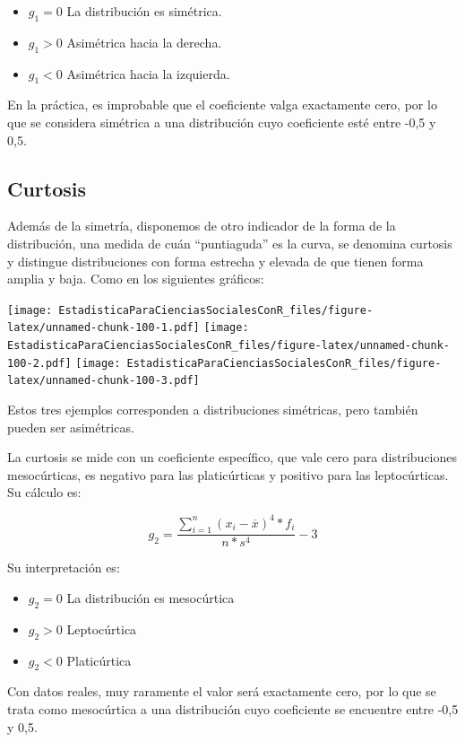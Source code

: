 \documentclass[]{book}
\begin{document}
\begin{itemize}
\item
  \(g_{1} = 0\) La distribución es simétrica.
\item
  \(g_{1} > 0\) Asimétrica hacia la derecha.
\item
  \(g_{1} < 0\) Asimétrica hacia la izquierda.
\end{itemize}

En la práctica, es improbable que el coeficiente valga exactamente cero,
por lo que se considera simétrica a una distribución cuyo coeficiente
esté entre -0,5 y 0,5.

\hypertarget{curtosis}{%
\subsection{Curtosis}\label{curtosis}}

Además de la simetría, disponemos de otro indicador de la forma de la
distribución, una medida de cuán ``puntiaguda'' es la curva, se denomina
curtosis y distingue distribuciones con forma estrecha y elevada de que
tienen forma amplia y baja. Como en los siguientes gráficos:

\texttt{[image: EstadisticaParaCienciasSocialesConR\_files/figure-latex/unnamed-chunk-100-1.pdf]} \texttt{[image: EstadisticaParaCienciasSocialesConR\_files/figure-latex/unnamed-chunk-100-2.pdf]} \texttt{[image: EstadisticaParaCienciasSocialesConR\_files/figure-latex/unnamed-chunk-100-3.pdf]}

Estos tres ejemplos corresponden a distribuciones simétricas, pero
también pueden ser asimétricas.

La curtosis se mide con un coeficiente específico, que vale cero para
distribuciones mesocúrticas, es negativo para las platicúrticas y
positivo para las leptocúrticas. Su cálculo es:

\[g_{2} = \frac{\sum_{i = 1}^{n}{\left( x_{i} - \overline{x} \right)^{4}*f_{i}}}{n*s^{4}} - 3\]

Su interpretación es:

\begin{itemize}
\item
  \(g_{2} = 0\) La distribución es mesocúrtica
\item
  \(g_{2} > 0\) Leptocúrtica
\item
  \(g_{2} < 0\) Platicúrtica
\end{itemize}

Con datos reales, muy raramente el valor será exactamente cero, por lo
que se trata como mesocúrtica a una distribución cuyo coeficiente se
encuentre entre -0,5 y 0,5.
\end{document}
